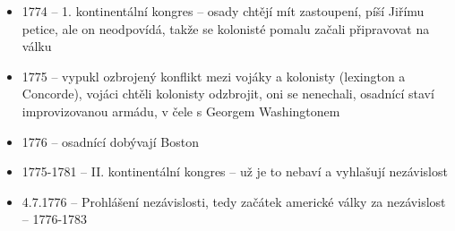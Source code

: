\documentclass{article}
\begin{document}
\begin{itemize}
\begin{itemize}
  \end{itemize}
  \item 1774 -- 1. kontinentální kongres -- osady chtějí mít zastoupení, píší Jiřímu petice, ale on neodpovídá, takže se kolonisté pomalu začali připravovat na válku
  \item 1775 -- vypukl ozbrojený konflikt mezi vojáky a kolonisty (lexington a Concorde), vojáci chtěli kolonisty odzbrojit, oni se nenechali, osadnící staví improvizovanou armádu, v čele s Georgem Washingtonem
  \item 1776 -- osadnící dobývají Boston
  \item 1775-1781 -- II. kontinentální kongres -- už je to nebaví a vyhlašují nezávislost
  \item 4.7.1776 -- Prohlášení nezávislosti, tedy začátek americké války za nezávislost -- 1776-1783
\end{itemize}
\end{document}
